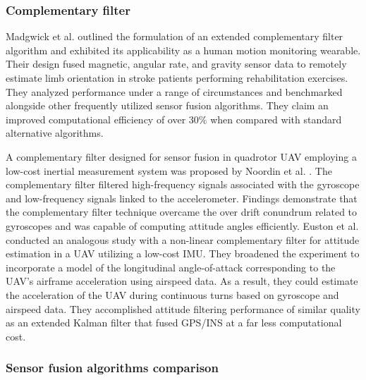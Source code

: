 \subsubsection{Complementary filter}

Madgwick et al. \cite{madgwick2020extended} outlined the formulation of an extended complementary filter algorithm and exhibited its applicability as a human motion monitoring wearable. Their design fused magnetic, angular rate, and gravity sensor data to remotely estimate limb orientation in stroke patients performing rehabilitation exercises. They analyzed performance under a range of circumstances and benchmarked alongside other frequently utilized sensor fusion algorithms. They claim an improved computational efficiency of over 30\% when compared with standard alternative algorithms.

A complementary filter designed for sensor fusion in quadrotor UAV employing a low-cost inertial measurement system was proposed by Noordin et al. \cite{noordin2018sensor}. The complementary filter filtered high-frequency signals associated with the gyroscope and low-frequency signals linked to the accelerometer. Findings demonstrate that the complementary filter technique overcame the over drift conundrum related to gyroscopes and was capable of computing attitude angles efficiently.
Euston et al. \cite{euston2008complementary} conducted an analogous study with a non-linear complementary filter for attitude estimation in a UAV utilizing a low-cost IMU. They broadened the experiment to incorporate a model of the longitudinal angle-of-attack corresponding to the UAV's airframe acceleration using airspeed data. As a result, they could estimate the acceleration of the UAV during continuous turns based on gyroscope and airspeed data. They accomplished attitude filtering performance of similar quality as an extended Kalman filter that fused GPS/INS at a far less computational cost.

\subsubsection{Sensor fusion algorithms comparison}

